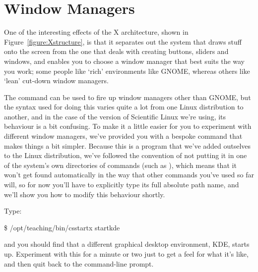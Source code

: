 
\section{Window Managers}
One of the interesting effects of the X architecture, shown in Figure~\ref{figure:Xstructure}, is that it separates out the system that draws stuff onto the screen from the one that deals with creating buttons, sliders and windows, and enables you to choose a window manager that best suits the way you work; some people like `rich' environments like GNOME, whereas others like `lean' cut-down window managers.

The  command can be used to fire up window managers other than GNOME, but the syntax used for doing this varies quite a lot from one Linux distribution to another, and in the case of the version of Scientific Linux we're using, its behaviour is a bit confusing. To make it a little easier for you to experiment with different window managers, we've provided you with a bespoke command  that makes things a bit simpler. Because this is a program that we've added outselves to the Linux distribution, we've followed the convention of not putting it in one of the system's own directories of commands (such as ), which means that it won't get found automatically in the way that other commands you've used so far will, so for now you'll have to explicitly type its full absolute path name, and we'll show you how to modify this behaviour shortly.

Type:

\begin{ttoutenv}
\$ /opt/teaching/bin/csstartx startkde
\end{ttoutenv}

and you should find that a different graphical desktop environment, KDE, starts up. Experiment with this for a minute or two just to get a feel for what it's like, and then quit back to the command-line prompt.

